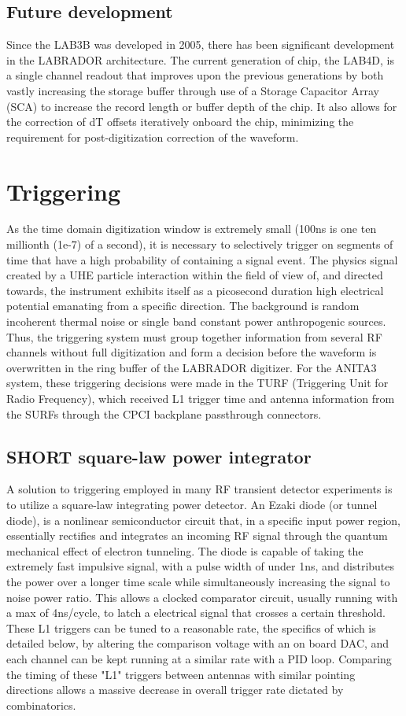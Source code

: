 	
	
	\subsection{Future development}
	Since the LAB3B was developed in 2005, there has been significant development in the LABRADOR architecture.  The current generation of chip, the LAB4D, is a single channel readout that improves upon the previous generations by both vastly increasing the storage buffer through use of a Storage Capacitor Array (SCA) to increase the record length or buffer depth of the chip.  It also allows for the correction of dT offsets iteratively onboard the chip, minimizing the requirement for post-digitization correction of the waveform.
	
			
		
\section{Triggering}
	As the time domain digitization window is extremely small (100ns is one ten millionth (1e-7) of a second), it is necessary to selectively trigger on segments of time that have a high probability of containing a signal event.  The physics signal created by a UHE particle interaction within the field of view of, and directed towards, the instrument exhibits itself as a picosecond duration high electrical potential emanating from a specific direction.  The background is random incoherent thermal noise or single band constant power anthropogenic sources.  Thus, the triggering system must group together information from several RF channels without full digitization and form a decision before the waveform is overwritten in the ring buffer of the LABRADOR digitizer.  For the ANITA3 system, these triggering decisions were made in the TURF (Triggering Unit for Radio Frequency), which received L1 trigger time and antenna information from the SURFs through the CPCI backplane passthrough connectors.
	\subsection{SHORT square-law power integrator}
		A solution to triggering employed in many RF transient detector experiments is to utilize a square-law integrating power detector.  An Ezaki diode (or tunnel diode), is a nonlinear semiconductor circuit that, in a specific input power region, essentially rectifies and integrates an incoming RF signal through the quantum mechanical effect of electron tunneling.  The diode is capable of taking the extremely fast impulsive signal, with a pulse width of under 1ns, and distributes the power over a longer time scale while simultaneously increasing the signal to noise power ratio.  This allows a clocked comparator circuit, usually running with a max of 4ns/cycle, to latch a electrical signal that crosses a certain threshold.  These L1 triggers can be tuned to a reasonable rate, the specifics of which is detailed below, by altering the comparison voltage with an on board DAC, and each channel can be kept running at a similar rate with a PID loop.  Comparing the timing of these "L1" triggers between antennas with similar pointing directions allows a massive decrease in overall trigger rate dictated by combinatorics.
